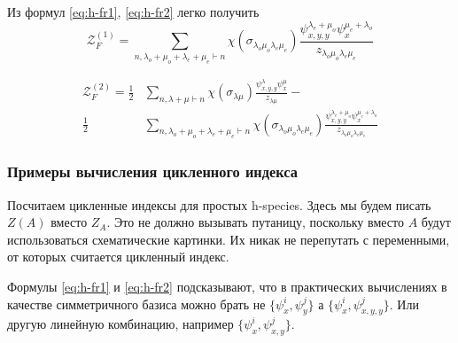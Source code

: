 Из формул \ref{eq:h-fr1}, \ref{eq:h-fr2} легко получить
\begin{equation}
\mathcal Z_F^{(1)} = 
\sum_{n, \lambda_o + \mu_o + \lambda_e + \mu_e \vdash
n}\chi(\sigma_{\lambda_o \mu_o \lambda_e \mu_e})
\frac{\psi_{x, y, y}^{\lambda_e + \mu_o} \psi_{x}^{\mu_e + 
\lambda_o}}{z_{\lambda_o \mu_o \lambda_e \mu_e}}
\end{equation}

\begin{equation}
\begin{split}
\mathcal Z_F^{(2)} = 
\frac{1}{2}&
\sum_{n, \lambda + \mu \vdash n}\chi(\sigma_{\lambda \mu})
\frac{\psi_{x, y, y}^{\lambda} \psi_{x}^{\mu}}{z_{\lambda \mu}}
- \\
\frac{1}{2}&
\sum_{n, \lambda_o + \mu_o + \lambda_e + \mu_e \vdash
n}\chi(\sigma_{\lambda_o \mu_o \lambda_e \mu_e})
\frac{\psi_{x, y, y}^{\lambda_e + \mu_o} \psi_{x}^{\mu_e + 
\lambda_o}}{z_{\lambda_o \mu_o \lambda_e \mu_e}}
\end{split}
\end{equation}

\subsubsection{Примеры вычисления цикленного индекса}
Посчитаем цикленные индексы для простых h-species.
Здесь мы будем писать $Z(A)$ вместо $Z_A$. Это не должно вызывать путаницу,
поскольку вместо $A$ будут использоваться схематические картинки. Их
никак не перепутать с переменными, от которых считается цикленный индекс. 

\begin{remark}
Формулы \ref{eq:h-fr1} и \ref{eq:h-fr2} подсказывают, что в практических
вычислениях в качестве симметричного базиса можно брать не $\{\psi_x^i,
\psi_y^j\}$ а $\{\psi_x^i, \psi_{x,y,y}^j\}$. 
Или другую линейную комбинацию, например $\{\psi_x^i, \psi_{x,y}^j\}$.
\end{remark}

